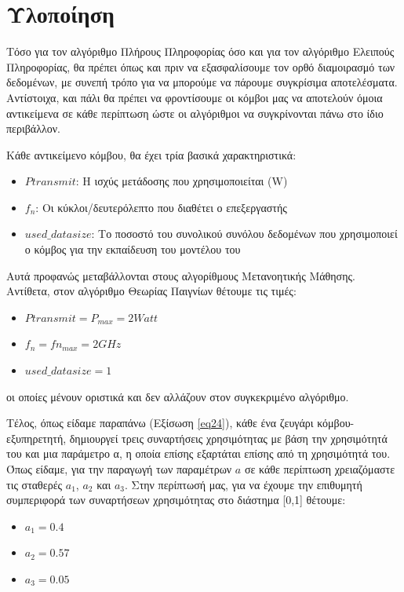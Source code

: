 \section{Υλοποίηση}

Τόσο για τον αλγόριθμο Πλήρους Πληροφορίας όσο και για τον αλγόριθμο Ελειπούς Πληροφορίας, θα πρέπει όπως και πριν να εξασφαλίσουμε τον ορθό διαμοιρασμό των δεδομένων, με συνεπή τρόπο για να μπορούμε να πάρουμε συγκρίσιμα αποτελέσματα. Αντίστοιχα, και πάλι θα πρέπει να φροντίσουμε οι κόμβοι μας να αποτελούν όμοια αντικείμενα σε κάθε περίπτωση ώστε οι αλγόριθμοι να συγκρίνονται πάνω στο ίδιο περιβάλλον.

Κάθε αντικείμενο κόμβου, θα έχει τρία βασικά χαρακτηριστικά:
\begin{itemize}
    \item $Ptransmit$: Η ισχύς μετάδοσης που χρησιμοποιείται (W)
    \item $f_n$: Οι κύκλοι/δευτερόλεπτο που διαθέτει ο επεξεργαστής
    \item $used\_datasize$: Το ποσοστό του συνολικού συνόλου δεδομένων που χρησιμοποιεί ο κόμβος για την εκπαίδευση του μοντέλου του   
\end{itemize}

Αυτά προφανώς μεταβάλλονται στους αλγορίθμους Μετανοητικής Μάθησης. Αντίθετα, στον αλγόριθμο Θεωρίας Παιγνίων θέτουμε τις τιμές:
\begin{itemize}
    \item $Ptransmit = P_{max} = 2 Watt$
    \item $f_n = fn_{max} = 2 GHz$
    \item $used\_datasize = 1$   
\end{itemize}
οι οποίες μένουν οριστικά και δεν αλλάζουν στον συγκεκριμένο αλγόριθμο.

Τέλος, όπως είδαμε παραπάνω (Εξίσωση \ref{eq24}), κάθε ένα ζευγάρι κόμβου-εξυπηρετητή, δημιουργεί τρεις συναρτήσεις χρησιμότητας με βάση την χρησιμότητά του και μια παράμετρο α, η οποία επίσης εξαρτάται επίσης από τη χρησιμότητά του. Όπως είδαμε, για την παραγωγή των παραμέτρων $a$ σε κάθε περίπτωση χρειαζόμαστε τις σταθερές $a_1$, $a_2$ και $a_3$. Στην περίπτωσή μας, για να έχουμε την επιθυμητή συμπεριφορά των συναρτήσεων χρησιμότητας στο διάστημα [0,1] θέτουμε:

\begin{itemize}
    \item $a_1 = 0.4$
    \item $a_2 = 0.57$
    \item $a_3 = 0.05$
\end{itemize}

